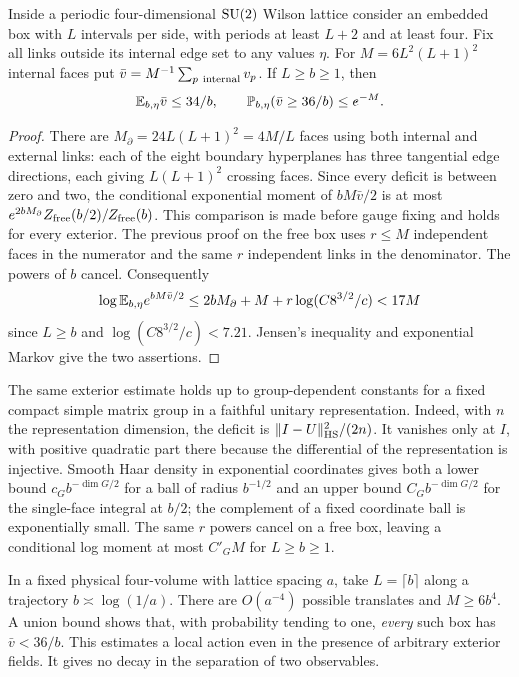 \begin{theorem}\label{cl:thm:exterior-mean-curvature}
Inside a periodic four-dimensional \(\mathrm{SU}(2)\) Wilson lattice consider an
embedded box with \(L\) intervals per side, with periods at least \(L+2\)
and at least four. Fix all links outside its internal edge set to any
values \(\eta\). For \(M=6L^2(L+1)^2\) internal faces put
\(\bar v=M^{-1}\sum_{p\ {\rm internal}}v_p\).
If \(L\ge b\ge1\), then
\[
 \mathbb{E}_{b,\eta}\bar v\le34/b,\qquad
 \mathbb P_{b,\eta}(\bar v\ge36/b)\le e^{-M}.
\]
\end{theorem}
\begin{proof}
There are \(M_\partial=24L(L+1)^2=4M/L\) faces using both internal
and external links: each of the eight boundary hyperplanes has three
tangential edge directions, each giving \(L(L+1)^2\) crossing faces.
Since every deficit is between zero and two, the conditional exponential
moment of \(bM\bar v/2\) is at most
\(e^{2bM_\partial} Z_{\rm free}(b/2)/Z_{\rm free}(b)\). This comparison
is made before gauge fixing and holds for every exterior. The previous
proof on the free box uses \(r\le M\) independent faces in the numerator
and the same \(r\) independent links in the denominator. The powers of
\(b\) cancel. Consequently
\[
 \log \mathbb{E}_{b,\eta} e^{bM\bar v/2}
 \le 2bM_\partial+M+r\log(C8^{3/2}/c)<17M
\]
since \(L\ge b\) and \(\log(C8^{3/2}/c)<7.21\).
Jensen's inequality and exponential Markov give the two assertions.
\end{proof}

The same exterior estimate holds up to group-dependent constants for a
fixed compact simple matrix group in a faithful unitary representation.
Indeed, with \(n\) the representation dimension, the deficit is
\(\|I-U\|_{\rm HS}^2/(2n)\). It vanishes only at \(I\), with positive
quadratic part there because the differential of the representation is
injective. Smooth Haar density in exponential coordinates gives both a
lower bound \(c_G b^{-\dim G/2}\) for a ball of radius \(b^{-1/2}\) and
an upper bound \(C_G b^{-\dim G/2}\) for the single-face integral at
\(b/2\); the complement of a fixed coordinate ball is exponentially small.
The same \(r\) powers cancel on a free box, leaving a conditional log
moment at most \(C'_G M\) for \(L\ge b\ge1\).

In a fixed physical four-volume with lattice spacing \(a\), take
\(L=\lceil b\rceil\) along a trajectory \(b\asymp\log(1/a)\).
There are \(O(a^{-4})\) possible translates and \(M\ge6b^4\).
A union bound shows that, with probability tending to one, \emph{every}
such box has \(\bar v<36/b\). This estimates a local action even in
the presence of arbitrary exterior fields. It gives no decay in the
separation of two observables.


